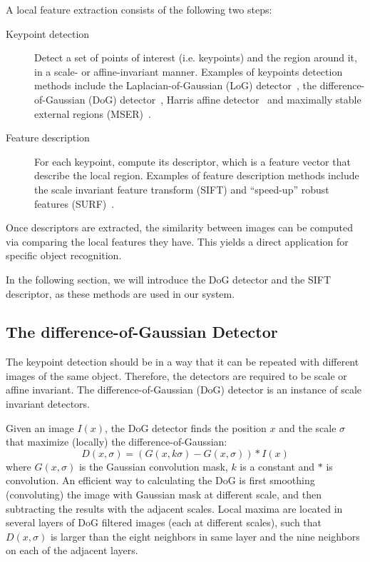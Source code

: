\documentclass[12pt,final,twoside]{report}
\theoremstyle{plain}
\theoremstyle{definition}
\theoremstyle{remark}
\begin{document}
A local feature extraction consists of the following two steps: 
\begin{description}
  \item[Keypoint detection] Detect a set of points of interest (i.e. keypoints) and the region around it, in a scale- or affine-invariant manner. Examples of keypoints detection methods include the Laplacian-of-Gaussian (LoG) detector~\cite{lindeberg_feature_1998}, the difference-of-Gaussian (DoG) detector~\cite{lowe_object_1999}, Harris affine detector~\cite{mikolajczyk_scale_2004} and maximally stable external regions (MSER)~\cite{matas_robust_2004}. 
  \item[Feature description] For each keypoint, compute its descriptor, which is a feature vector that describe the local region. Examples of feature description methods include the scale invariant feature transform (SIFT) and ``speed-up'' robust features (SURF)~\cite{bay_speeded-up_2008}.
\end{description}

Once descriptors are extracted, the similarity between images can be computed via comparing the local features they have. This yields a direct application for specific object recognition.

In the following section, we will introduce the DoG detector and the SIFT descriptor, as these methods are used in our system.

\subsection{The difference-of-Gaussian Detector}
The keypoint detection should be in a way that it can be repeated with different images of the same object. Therefore, the detectors are required to be scale or affine invariant. The difference-of-Gaussian (DoG) detector is an instance of scale invariant detectors.

Given an image $I(x)$, the DoG detector finds the position $x$ and the scale $\sigma$ that maximize (locally) the difference-of-Gaussian:
\begin{equation}
  D(x,\sigma) = (G(x,k\sigma) - G(x,\sigma)) * I(x)
\end{equation}
where $G(x,\sigma)$ is the Gaussian convolution mask, $k$ is a constant and $*$ is convolution. An efficient way to calculating the DoG is first smoothing (convoluting) the image with Gaussian mask at different scale, and then subtracting the results with the adjacent scales. Local maxima are located in several layers of DoG filtered images (each at different scales), such that $D(x,\sigma)$ is larger than the eight neighbors in same layer and the nine neighbors on each of the adjacent layers.
\end{document}
